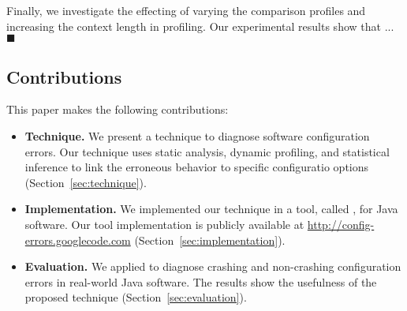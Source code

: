 Finally, we investigate the effecting of varying the comparison profiles
and increasing the context length in profiling. Our experimental results
show that ... $\blacksquare$






\subsection{Contributions}
This paper makes the following contributions:

\begin{itemize}

\item \textbf{Technique.} We present a technique to diagnose
software configuration errors. Our technique uses static analysis,
dynamic profiling, and statistical inference to link the
erroneous behavior to specific configuratio options (Section~\ref{sec:technique}).


\item \textbf{Implementation.} We implemented our technique 
in a tool, called \ourtool, for Java software. Our tool implementation is publicly available at
\url{http://config-errors.googlecode.com} (Section~\ref{sec:implementation}).


\item \textbf{Evaluation.} We applied \ourtool to diagnose
\errors crashing and non-crashing configuration errors in \subjectnum
real-world Java software. The results
show the usefulness of the proposed technique (Section~\ref{sec:evaluation}).

\end{itemize}



